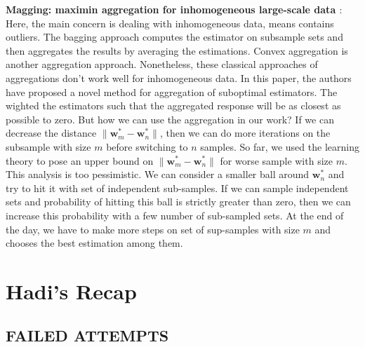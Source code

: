 \documentclass[11pt, a4paper, reqno, twoside]{scrartcl}
\theoremstyle{style}
\newcommand{\wv}{\bm{w}}
\newcommand{\0}{\mathbf{0}} %
\begin{document}
\textbf{Magging: maximin aggregation for inhomogeneous large-scale data \cite{buhlmann2014magging}}
: Here, the main concern is dealing with inhomogeneous data, means contains
outliers. The bagging approach computes the estimator on subsample sets and then
aggregates the results by averaging the estimations. Convex aggregation is
another aggregation approach. Nonetheless, these classical approaches of
aggregations don't work well for inhomogeneous data. In this paper, the authors
have proposed a novel method for aggregation of suboptimal estimators. The
wighted the estimators such that the aggregated response will be as closest as
possible to zero. But how we can use the aggregation in our work? If we can
decrease the distance $\| \wv_m^* - \wv_n^* \|$, then we can do more iterations
on the subsample with size $m$ before switching to $n$ samples. So far, we used
the learning theory to pose an upper bound on $\|
\wv_m^* - \wv_n^* \|$ for worse sample with size $m$. This analysis is too
pessimistic. We can consider a smaller ball around $\wv_n^*$ and try to hit it
with set of independent sub-samples. If we can sample independent sets and
probability of hitting this ball is strictly greater than zero, then we can
increase this probability with a few number of sub-sampled sets.
At the end of the day, we have to make more steps on set of sup-samples with
size $m$ and chooses the best estimation among them. \\
\section*{Hadi's Recap}
\subsection*{FAILED ATTEMPTS}
\end{document}
